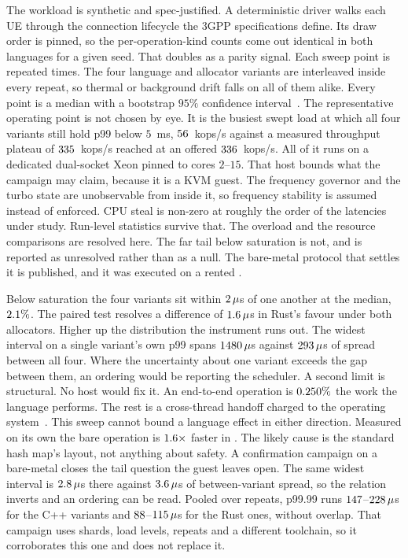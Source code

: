 \documentclass[english,twoside,openright,a4paper,censored,csm,software-track-2020]{HYthesisML}
\begin{document}
The workload is synthetic and spec-justified. A deterministic driver walks each UE
through the connection lifecycle the 3GPP specifications define. Its draw order is pinned,
so the per-operation-kind counts come out identical in both languages for a given seed.
That doubles as a parity signal. Each sweep point is repeated \NRepeats{} times. The
four language and allocator variants are interleaved inside every repeat, so thermal or
background drift falls on all of them alike. Every point is a median with a bootstrap
$95\%$ confidence interval~\cite{georges2007rigorous,efron1993bootstrap}. The
representative operating point is not chosen by eye. It is the busiest swept load at
which all four variants still hold p99 below $5$~ms, $56$~kops/s against a
measured throughput plateau of $335$~kops/s reached at an offered
$336$~kops/s. All of it runs on a dedicated dual-socket
Xeon pinned to cores $2$--$15$. That host bounds what the campaign may claim, because it
is a KVM guest. The frequency governor and the turbo state are unobservable from inside
it, so frequency stability is assumed instead of enforced. CPU steal is non-zero at
roughly the order of the latencies under study. Run-level statistics survive that. The
overload and the resource comparisons are resolved here. The far tail below saturation
is not, and is reported as unresolved rather than as a null. The bare-metal protocol that
settles it is published, and it was executed on a rented \BmCpu{}.

Below saturation the four variants sit within $2\,\mu$s of one another at the
median, $2.1\%$. The paired test resolves a difference of
$1.6\,\mu$s in Rust's favour under both allocators. Higher up the
distribution the instrument runs out. The widest interval on a single variant's own p99
spans $1480\,\mu$s against $293\,\mu$s of spread between all
four. Where the uncertainty about one variant exceeds the gap between them, an ordering
would be reporting the scheduler. A second limit is structural. No host would fix it. An
end-to-end operation is $0.250\%$ the work the language performs. The rest
is a cross-thread handoff charged to the operating
system~\cite{zhou2025oltp}. This sweep cannot bound a language effect in either
direction. Measured on its own the bare operation is $1.6\times$ faster in
\BudgetCoreFaster{}. The likely cause is the standard hash map's layout, not anything
about safety. A confirmation campaign on a bare-metal \BmCpu{} closes the tail question
the guest leaves open. The same widest interval is $2.8\,\mu$s there
against $3.6\,\mu$s of between-variant spread, so the relation inverts and
an ordering can be read. Pooled over \BmRepeats{} repeats, p99.99 runs
$147$--$228\,\mu$s for the C++ variants and
$88$--$115\,\mu$s for the Rust ones, without overlap. That
campaign uses \BmShards{} shards, \BmLoadLevels{} load levels, \BmRepeats{} repeats and a
different toolchain, so it corroborates this one and does not replace it.
\end{document}
